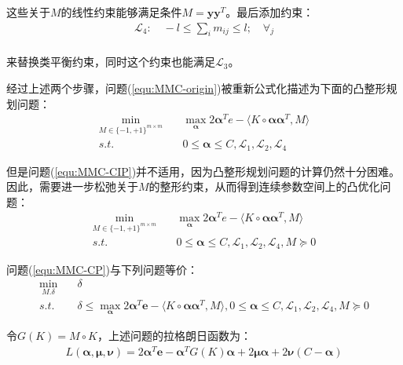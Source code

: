 这些关于$M$的线性约束能够满足条件$M=\mathbf{yy}^T$。最后添加约束：
\begin{equation*}
\begin{split}
\mathcal{L}_4:\quad -l \le \sum_im_{ij} \le l; \quad \forall_j \\
\end{split}
\end{equation*}

来替换类平衡约束，同时这个约束也能满足$\mathcal{L}_3$。

经过上述两个步骤，问题(\ref{equ:MMC-origin})被重新公式化描述为下面的凸整形规划问题：
\begin{equation}
\begin{split}
\min_{M\in\{-1,+1\}^{m\times m}} \quad & \max_{\mathbf{\alpha}} 2\mathbf{\alpha}^Te-\langle K \circ \mathbf{\alpha}\mathbf{\alpha}^T,M \rangle \\ 
s.t. \quad & 0 \le \mathbf{\alpha} \le C,\mathcal{L}_1,\mathcal{L}_2,\mathcal{L}_4
\label{equ:MMC-CIP}
\end{split}
\end{equation}

但是问题(\ref{equ:MMC-CIP})并不适用，因为凸整形规划问题的计算仍然十分困难。因此，需要进一步松弛关于$M$的整形约束，从而得到连续参数空间上的凸优化问题：
\begin{equation}
\begin{split}
\min_{M\in\{-1,+1\}^{m\times m}} \quad & \max_{\mathbf{\alpha}} 2\mathbf{\alpha}^Te-\langle K \circ \mathbf{\alpha}\mathbf{\alpha}^T,M \rangle \\ 
s.t. \quad & 0 \le \mathbf{\alpha} \le C,\mathcal{L}_1,\mathcal{L}_2,\mathcal{L}_4,M\succeq 0
\label{equ:MMC-CP}
\end{split}
\end{equation}

问题(\ref{equ:MMC-CP})与下列问题等价：
\begin{equation}
\begin{split}
\min_{M.\delta} \quad & \delta \\
s.t. \quad & \delta \le \max_{\mathbf{\alpha}}2\mathbf{\alpha}^T\mathbf{e}-\langle K \circ \mathbf{\alpha}\mathbf{\alpha}^T,M \rangle,0 \le \mathbf{\alpha} \le C, \mathcal{L}_1,\mathcal{L}_2,\mathcal{L}_4,M \succeq 0
\end{split}
\end{equation}

令$G(K)=M \circ K$，上述问题的拉格朗日函数为：
\begin{equation}
\begin{split}
L(\mathbf{\alpha},\mathbf{\mu},\mathbf{\nu}) = 2\mathbf{\alpha}^T\mathbf{e} - \mathbf{\alpha}^TG(K)\mathbf{\alpha} + 2\mathbf{\mu}\mathbf{\alpha} + 2\mathbf{\nu}(C-\mathbf{\alpha})
\end{split}
\end{equation}

